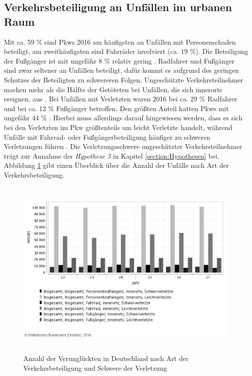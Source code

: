 \subsection{Verkehrsbeteiligung an Unfällen im urbanen Raum} 
Mit ca. 59 \% sind Pkws 2016 am häufigsten an Unfällen mit Personenschaden beteiligt, am zweithäufigsten sind Fahrräder involviert (ca. 19 \%). Die Beteiligung der Fußgänger ist mit ungefähr 8 \% relativ gering \parencite[S. 102]{StatistischesBundesamt.2018c}. Radfahrer und Fußgänger sind zwar seltener an Unfällen beteiligt, dafür kommt es aufgrund des geringen Schutzes der Beteiligten zu schwereren Folgen. Ungeschützte Verkehrsteilnehmer machen mehr als die Hälfte der Getöteten bei Unfällen, die sich innerorts ereignen, aus \parencite[S. 221]{Schreiber.2014}. Bei Unfällen mit Verletzten waren 2016 bei ca. 29 \% Radfahrer und bei ca. 12 \% Fußgänger betroffen. Den größten Anteil hatten Pkws mit ungefähr 44 \% \parencite[S. 139-142]{StatistischesBundesamt.2018c}. Hierbei muss allerdings darauf hingewiesen werden, dass es sich bei den Verletzten im Pkw größtenteils um leicht Verletzte handelt, während Unfälle mit Fahrrad- oder Fußgängerbeteiligung häufiger zu schweren Verletzungen führen \parencite[S. 145-148]{StatistischesBundesamt.2018c}. Die Verletzungsschwere ungeschützter Verkehrsteilnehmer trägt zur Annahme der \textit{Hypothese 5} in Kapitel \ref{section:Hypothesen} bei. Abbildung \ref{fig:Verkehrsbeteiligung} gibt einen Überblick über die Anzahl der Unfälle nach Art der Verkehrsbeteiligung.

\begin{savenotes}
	\begin{figure}[H]
		\centering
		\includegraphics[width=12cm,height=9cm]{figures/Verkehrsbeteiligung}
		\caption[Anzahl der Unfälle innersorts nach Art der Verkehrsbeteiligung]{Anzahl der Verunglückten in Deutschland nach Art der Verkehrsbeteiligung und Schwere der Verletzung \parencite{StatistischesBundesamt.2018d}}\label{fig:Verkehrsbeteiligung}
	\end{figure}
\end{savenotes}

